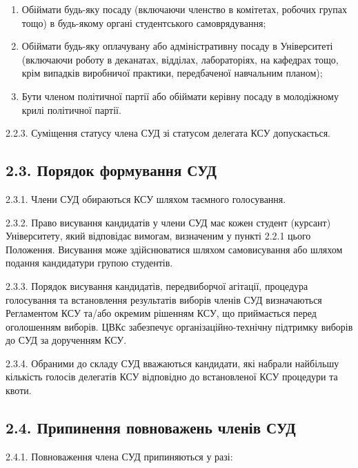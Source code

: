         \begin{enumerate}[label=\alph*)]
            \item Обіймати будь-яку посаду (включаючи членство в комітетах, робочих групах тощо) в будь-якому органі студентського самоврядування;
            \item Обіймати будь-яку оплачувану або адміністративну посаду в Університеті (включаючи роботу в деканатах, відділах, лабораторіях, на кафедрах тощо, крім випадків виробничої практики, передбаченої навчальним планом);
            \item Бути членом політичної партії або обіймати керівну посаду в молодіжному крилі політичної партії.
        \end{enumerate}

    2.2.3. Суміщення статусу члена СУД зі статусом делегата КСУ допускається.

\subsection*{2.3. Порядок формування СУД}
    2.3.1. Члени СУД обираються КСУ шляхом таємного голосування.

    2.3.2. Право висування кандидатів у члени СУД має кожен студент (курсант) Університету, який відповідає вимогам, визначеним у пункті 2.2.1 цього Положення. Висування може здійснюватися шляхом самовисування або шляхом подання кандидатури групою студентів.

    2.3.3. Порядок висування кандидатів, передвиборчої агітації, процедура голосування та встановлення результатів виборів членів СУД визначаються Регламентом КСУ та/або окремим рішенням КСУ, що приймається перед оголошенням виборів. ЦВКс забезпечує організаційно-технічну підтримку виборів до СУД за дорученням КСУ.

    2.3.4. Обраними до складу СУД вважаються кандидати, які набрали найбільшу кількість голосів делегатів КСУ відповідно до встановленої КСУ процедури та квоти.

\subsection*{2.4. Припинення повноважень членів СУД}
    2.4.1. Повноваження члена СУД припиняються у разі:

